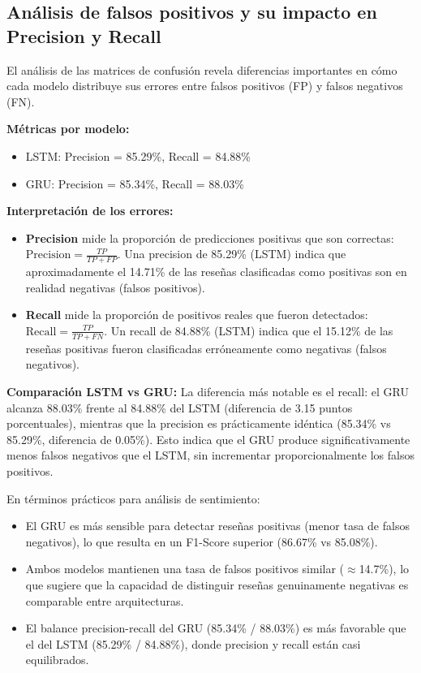 \subsection{Análisis de falsos positivos y su impacto en Precision y Recall}

El análisis de las matrices de confusión revela diferencias importantes en cómo cada modelo distribuye sus errores entre falsos positivos (FP) y falsos negativos (FN).

\textbf{Métricas por modelo:}
\begin{itemize}
    \item LSTM: Precision = 85.29\%, Recall = 84.88\%
    \item GRU: Precision = 85.34\%, Recall = 88.03\%
\end{itemize}

\textbf{Interpretación de los errores:}
\begin{itemize}
    \item \textbf{Precision} mide la proporción de predicciones positivas que son correctas: $\text{Precision} = \frac{TP}{TP + FP}$. Una precision de 85.29\% (LSTM) indica que aproximadamente el 14.71\% de las reseñas clasificadas como positivas son en realidad negativas (falsos positivos).
    \item \textbf{Recall} mide la proporción de positivos reales que fueron detectados: $\text{Recall} = \frac{TP}{TP + FN}$. Un recall de 84.88\% (LSTM) indica que el 15.12\% de las reseñas positivas fueron clasificadas erróneamente como negativas (falsos negativos).
\end{itemize}

\textbf{Comparación LSTM vs GRU:} La diferencia más notable es el recall: el GRU alcanza 88.03\% frente al 84.88\% del LSTM (diferencia de 3.15 puntos porcentuales), mientras que la precision es prácticamente idéntica (85.34\% vs 85.29\%, diferencia de 0.05\%). Esto indica que el GRU produce significativamente menos falsos negativos que el LSTM, sin incrementar proporcionalmente los falsos positivos.

En términos prácticos para análisis de sentimiento:
\begin{itemize}
    \item El GRU es más sensible para detectar reseñas positivas (menor tasa de falsos negativos), lo que resulta en un F1-Score superior (86.67\% vs 85.08\%).
    \item Ambos modelos mantienen una tasa de falsos positivos similar ($\approx$14.7\%), lo que sugiere que la capacidad de distinguir reseñas genuinamente negativas es comparable entre arquitecturas.
    \item El balance precision-recall del GRU (85.34\% / 88.03\%) es más favorable que el del LSTM (85.29\% / 84.88\%), donde precision y recall están casi equilibrados.
\end{itemize}

